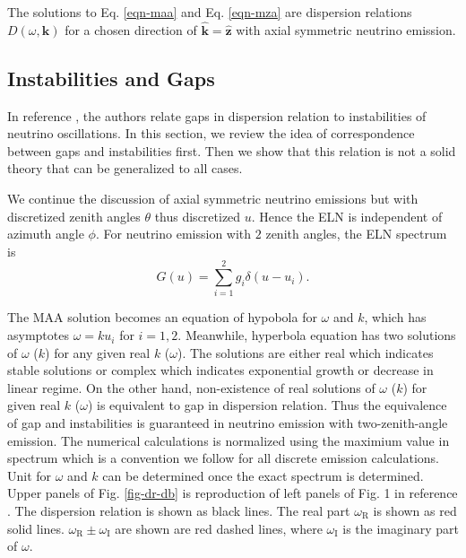 The solutions to Eq. \eqref{eqn-maa} and Eq. \eqref{eqn-mza} are dispersion relations $D(\omega,\mathbf k)$ for a chosen direction of $\hat{\mathbf k} = \hat{\mathbf z}$ with axial symmetric neutrino emission.









\subsection{\label{chap:dr-sec:fast-mode-subsec:instabilities-and-gaps}Instabilities and Gaps}

In reference \cite{Izaguirre2016a}, the authors relate gaps in dispersion relation to instabilities of neutrino oscillations. In this section, we review the idea of correspondence between gaps and instabilities first. Then we show that this relation is not a solid theory that can be generalized to all cases.

We continue the discussion of axial symmetric neutrino emissions but with discretized zenith angles $\theta$ thus discretized $u$. Hence the ELN is independent of azimuth angle $\phi$. For neutrino emission with $2$ zenith angles, the ELN spectrum is
\begin{equation}
G(u)= \sum_{i=1}^2 g_i \delta(u - u_i).
\end{equation}

The MAA solution becomes an equation of hypobola for $\omega$ and $k$, which has asymptotes $\omega = k u_i$ for $i=1,2$. Meanwhile, hyperbola equation has two solutions of $\omega$ ($k$) for any given real $k$ ($\omega$). The solutions are either real which indicates stable solutions or complex which indicates exponential growth or decrease in linear regime. On the other hand, non-existence of real solutions of $\omega$ ($k$) for given real $k$ ($\omega$) is equivalent to gap in dispersion relation. Thus the equivalence of gap and instabilities is guaranteed in neutrino emission with two-zenith-angle emission. The numerical calculations is normalized using the maximium value in spectrum which is a convention we follow for all discrete emission calculations. Unit for $\omega$ and $k$ can be determined once the exact spectrum is determined. Upper panels of Fig. \ref{fig-dr-db} is reproduction of left panels of Fig. 1 in reference \cite{Izaguirre2016a}. The dispersion relation is shown as black lines. The real part $\omega_{\mathrm R}$ is shown as red solid lines. $\omega_{\mathrm R} \pm \omega_{\mathrm I}$ are shown are red dashed lines, where $\omega_{\mathrm I}$ is the imaginary part of $\omega$.



